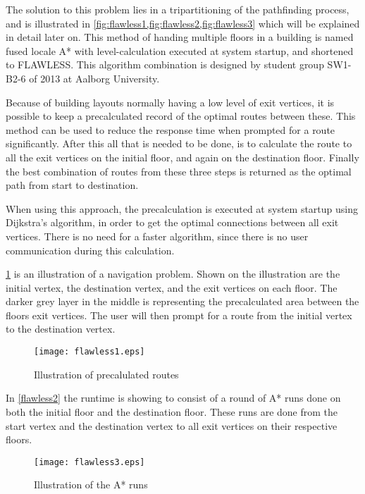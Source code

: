 The solution to this problem lies in a tripartitioning of the pathfinding process, and is illustrated in \cref{fig:flawless1,fig:flawless2,fig:flawless3} which will be explained in detail later on. This method of handing multiple floors in a building is named fused locale A* with level-calculation executed at system startup, and shortened to FLAWLESS. This algorithm combination is designed by student group SW1-B2-6 of 2013 at Aalborg University.

Because of building layouts normally having a low level of exit vertices, it is possible to keep a precalculated record of the optimal routes between these. This method can be used to reduce the response time when prompted for a route significantly.
After this all that is needed to be done, is to calculate the route to all the exit vertices on the initial floor, and again on the destination floor. Finally the best combination of routes from these three steps is returned as the optimal path from start to destination.

When using this approach, the precalculation is executed at system startup using Dijkstra's algorithm, in order to get the optimal connections between all exit vertices. There is no need for a faster algorithm, since there is no user communication during this calculation.

\cref{fig:flawless1} is an illustration of a navigation problem. Shown on the illustration are the initial vertex, the destination vertex, and the exit vertices on each floor. The darker grey layer in the middle is representing the precalculated area between the floors exit vertices. The user will then prompt for a route from the initial vertex to the destination vertex.

\begin{figure}[ht!]
    \centering
    \texttt{[image: flawless1.eps]}
    \caption{Illustration of precalulated routes}
    \label{fig:flawless1}
  \end{figure}

In \cref{flawless2} the runtime is showing to consist of a round of A* runs done on both the initial floor and the destination floor. These runs are done from the start vertex and the destination vertex to all exit vertices on their respective floors.

\begin{figure}[ht!]
    \centering
    \texttt{[image: flawless3.eps]}
    \caption{Illustration of the A* runs}
    \label{fig:flawless2}
  \end{figure}

